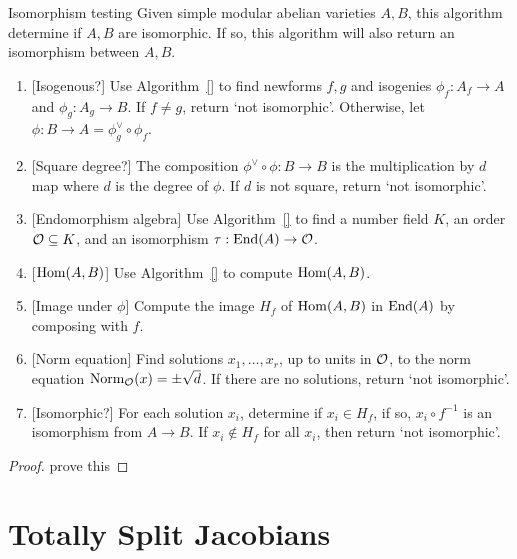 \documentclass[11pt, proquest]{uwthesis}
\begin{document}
\begin{algorithm}{Isomorphism testing}%
    \label{alg:isomorphism_testing}
    Given simple modular abelian varieties $A, B$, this algorithm determine if
    $A, B$ are isomorphic. If so, this algorithm will also return an
    isomorphism between $A, B$.
    \begin{enumerate}
        \item{}
            [Isogenous?] Use Algorithm~\ref{} to find newforms $f,g$ and
            isogenies $\phi_f:A_f\to A$ and $\phi_g:A_g\to B$. If $f\neq g$,
            return `not isomorphic'. Otherwise, let $\phi:B\to A=\phi_g ^\vee
            \circ \phi_f$.
        \item{}
            [Square degree?] The composition $\phi^\vee \circ \phi:B\to B$ is
            the multiplication by $d$ map where $d$ is the degree of $\phi$. If
            $d$ is not square, return `not isomorphic'.
        \item{}
            [Endomorphism algebra] Use Algorithm~\ref{} to find a number field
            $K$, an order $\mathcal{O}\subseteq K$, and an isomorphism $\tau:\operatorname{End}(A)\to
            \mathcal{O}$.
        \item{}
            [$\operatorname{Hom}(A, B)$] Use Algorithm~\ref{} to compute $\operatorname{Hom}(A,B)$.
        \item{}
            [Image under $\phi$] Compute the image $H_f$ of $\operatorname{Hom}(A, B)$ in
            $\operatorname{End}(A)$ by composing with $f$.
        \item{}
            [Norm equation] Find solutions $x_1,\ldots,x_r$, up to units in
            $\mathcal{O}$, to the norm equation $\operatorname{Norm}_{\mathcal{O}} (x) = \pm \sqrt{d}$. If
            there are no solutions, return `not isomorphic'.
        \item{}
            [Isomorphic?] For each solution $x_i$, determine if $x_i\in H_f$,
            if so, $x_i \circ f^{-1}$ is an isomorphism from $A\to B$. If
            $x_i\notin H_f$ for all $x_i$, then return `not isomorphic'.
    \end{enumerate}
\end{algorithm}
\begin{proof}
    prove this
\end{proof}

\chapter{Totally Split Jacobians}%
\label{chap:totally_split}
\end{document}
